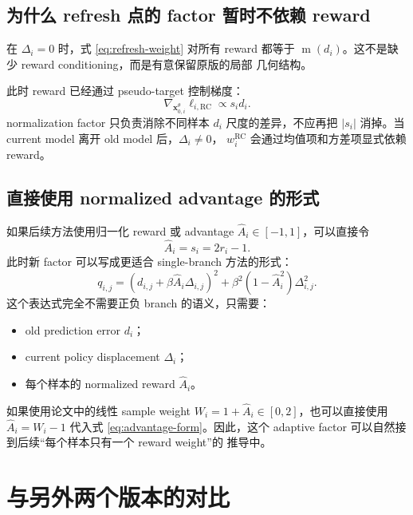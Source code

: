 \documentclass[11pt,a4paper]{article}
\newcommand{\mabs}{\operatorname{m}}
\newcommand{\xcur}{\mathbf{x}_{0,i}^{\theta}}
\newcommand{\R}{\mathrm{RC}}
\begin{document}
\subsection{为什么 refresh 点的 factor 暂时不依赖 reward}

在 $\Delta_i=0$ 时，式 \eqref{eq:refresh-weight} 对所有 reward 都等于
$\mabs(d_i)$。这不是缺少 reward conditioning，而是有意保留原版的局部
几何结构。

此时 reward 已经通过 pseudo-target 控制梯度：
\begin{equation}
\nabla_{\xcur}\ell_{i,\R}
\propto
s_i d_i.
\end{equation}
normalization factor 只负责消除不同样本 $d_i$ 尺度的差异，不应再把
$|s_i|$ 消掉。当 current model 离开 old model 后，$\Delta_i\neq 0$，
$w_i^{\R}$ 会通过均值项和方差项显式依赖 reward。

\subsection{直接使用 normalized advantage 的形式}

如果后续方法使用归一化 reward 或 advantage
$\widehat{A}_i\in[-1,1]$，可以直接令
\begin{equation}
\widehat{A}_i=s_i=2r_i-1.
\end{equation}
此时新 factor 可以写成更适合 single-branch 方法的形式：
\begin{equation}
\boxed{
q_{i,j}
=
\left(
d_{i,j}+\beta\widehat{A}_i\Delta_{i,j}
\right)^2
+
\beta^2
\left(
1-\widehat{A}_i^2
\right)
\Delta_{i,j}^2.
}
\label{eq:advantage-form}
\end{equation}
这个表达式完全不需要正负 branch 的语义，只需要：
\begin{itemize}
  \item old prediction error $d_i$；
  \item current policy displacement $\Delta_i$；
  \item 每个样本的 normalized reward $\widehat{A}_i$。
\end{itemize}

如果使用论文中的线性 sample weight
$W_i=1+\widehat{A}_i\in[0,2]$，也可以直接使用
$\widehat{A}_i=W_i-1$ 代入式 \eqref{eq:advantage-form}。因此，这个
adaptive factor 可以自然接到后续“每个样本只有一个 reward weight”的
推导中。

\section{与另外两个版本的对比}
\end{document}
